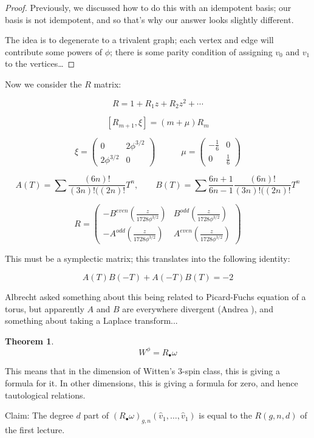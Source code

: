 \documentclass{amsart}
\theoremstyle{definition}
\newtheorem{theorem}{Theorem}
\begin{document}
\begin{proof} 
Previously, we discussed how to do this with an idempotent basis; our basis is not idempotent, and so that's why our answer looks slightly different.

The idea is to degenerate to a trivalent graph; each vertex and edge will contribute some powers of $\phi$; there is some parity condition of assigning $v_0$ and $v_1$ to the vertices\dots
\end{proof}

Now we consider the $R$ matrix:

$$R=1+R_1z+R_2z^2+\cdots$$

$$[R_{m+1},\xi]=(m+\mu)R_m$$

$$\xi=\begin{pmatrix} 0 & 2\phi^{3/2} \\ 2\phi^{3/2} & 0 
\end{pmatrix}\quad\quad\quad \mu=\begin{pmatrix} -\frac{1}{6} & 0 \\ 0 & \frac{1}{6}
\end{pmatrix}$$

$$A(T)=\sum \frac{(6n)!}{(3n)!((2n)!} T^n,\quad\quad B(T)=\sum\frac{6n+1}{6n-1}\frac{(6n)!}{(3n)!((2n)!} T^n$$


$$R=\begin{pmatrix}
-B^{even}(\frac{z}{1728\phi^{3/2}}) & B^{odd}(\frac{z}{1728\phi^{3/2}}) \\
-A^{odd}(\frac{z}{1728\phi^{3/2}}) & A^{even}(\frac{z}{1728\phi^{3/2}}) 
\end{pmatrix}$$

This must be a symplectic matrix; this translates into the following identity:

$$A(T)B(-T)+A(-T)B(T)=-2$$

Albrecht asked something about this being related to Picard-Fuchs equation of a torus, but apparently $A$ and $B$ are everywhere divergent (Andrea ), and something about taking a Laplace transform...


\begin{theorem}
$$W^\phi=R_\bullet\omega$$
\end{theorem}

This means that in the dimension of Witten's 3-spin class, this is giving a formula for it.  In other dimensions, this is giving a formula for zero, and hence tautological relations.

Claim: The degree $d$ part of $(R_\bullet \omega)_{g,n}(\hat{v}_1,\dots, \hat{v}_1)$ is equal to the $R(g,n,d)$ of the first lecture.
\end{document}
